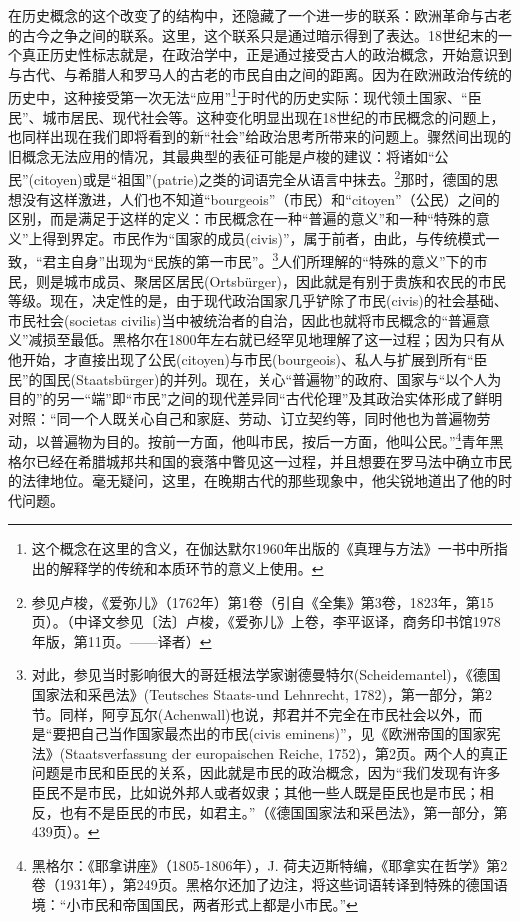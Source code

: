在历史概念的这个改变了的结构中，还隐藏了一个进一步的联系：欧洲革命与古老的古今之争之间的联系。这里，这个联系只是通过暗示得到了表达。18世纪末的一个真正历史性标志就是，在政治学中，正是通过接受古人的政治概念，开始意识到与古代、与希腊人和罗马人的古老的市民自由之间的距离。因为在欧洲政治传统的历史中，这种接受第一次无法“应用”\footnote{这个概念在这里的含义，在伽达默尔1960年出版的《真理与方法》一书中所指出的解释学的传统和本质环节的意义上使用。}于时代的历史实际：现代领土国家、“臣民”、城市居民、现代社会等。这种变化明显出现在18世纪的市民概念的问题上，也同样出现在我们即将看到的新“社会”给政治思考所带来的问题上。骤然间出现的旧概念无法应用的情况，其最典型的表征可能是卢梭的建议：将诸如“公民”(citoyen)或是“祖国”(patrie)之类的词语完全从语言中抹去。\footnote{参见卢梭，《爱弥儿》（1762年）第1卷（引自《全集》第3卷，1823年，第15页）。（中译文参见〔法〕卢梭，《爱弥儿》上卷，李平讴译，商务印书馆1978年版，第11页。——译者）}那时，德国的思想没有这样激进，人们也不知道“bourgeois”（市民）和“citoyen”（公民）之间的区别，而是满足于这样的定义：市民概念在一种“普遍的意义”和一种“特殊的意义”上得到界定。市民作为“国家的成员(civis)”，属于前者，由此，与传统模式一致，“君主自身”出现为“民族的第一市民”。\footnote{对此，参见当时影响很大的哥廷根法学家谢德曼特尔(Scheidemantel)，《德国国家法和采邑法》(Teutsches Staats-und Lehnrecht, 1782)，第一部分，第2节。同样，阿亨瓦尔(Achenwall)也说，邦君并不完全在市民社会以外，而是“要把自己当作国家最杰出的市民(civis eminens)”，见《欧洲帝国的国家宪法》(Staatsverfassung der europaischen Reiche, 1752)，第2页。两个人的真正问题是市民和臣民的关系，因此就是市民的政治概念，因为“我们发现有许多臣民不是市民，比如说外邦人或者奴隶；其他一些人既是臣民也是市民；相反，也有不是臣民的市民，如君主。”（《德国国家法和采邑法》，第一部分，第439页）。}人们所理解的“特殊的意义”下的市民，则是城市成员、聚居区居民(Ortsbürger)，因此就是有别于贵族和农民的市民等级。现在，决定性的是，由于现代政治国家几乎铲除了市民(civis)的社会基础、市民社会(societas civilis)当中被统治者的自治，因此也就将市民概念的“普遍意义”减损至最低。黑格尔在1800年左右就已经罕见地理解了这一过程；因为只有从他开始，才直接出现了公民(citoyen)与市民(bourgeois)、私人与扩展到所有“臣民”的国民(Staatsbürger)的并列。现在，关心“普遍物”的政府、国家与“以个人为目的”的另一“端”即“市民”之间的现代差异同“古代伦理”及其政治实体形成了鲜明对照：“同一个人既关心自己和家庭、劳动、订立契约等，同时他也为普遍物劳动，以普遍物为目的。按前一方面，他叫市民，按后一方面，他叫公民。”\footnote{黑格尔：《耶拿讲座》（1805-1806年），J. 荷夫迈斯特编，《耶拿实在哲学》第2卷（1931年），第249页。黑格尔还加了边注，将这些词语转译到特殊的德国语境：“小市民和帝国国民，两者形式上都是小市民。”}青年黑格尔已经在希腊城邦共和国的衰落中瞥见这一过程，并且想要在罗马法中确立市民的法律地位。毫无疑问，这里，在晚期古代的那些现象中，他尖锐地道出了他的时代问题。

